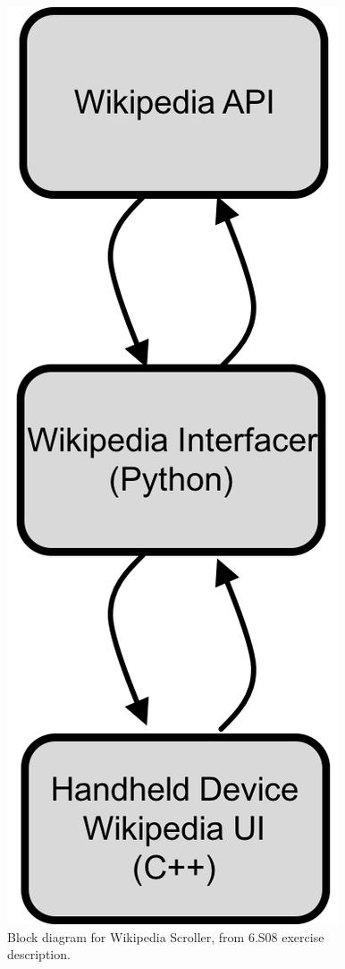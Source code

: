 \documentclass[12pt]{article}
\begin{document}
\begin{figure}[h]
\centering
\includegraphics[scale=0.5]{wiki-block-diagram.png}
\vspace{5mm}
\caption{Block diagram for Wikipedia Scroller, from 6.S08 exercise description.}
\label{fig:wiki-scroller-block}
\end{figure}
\end{document}
